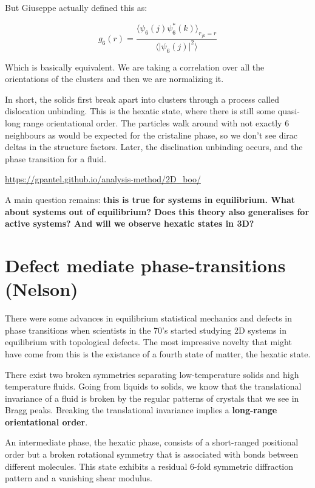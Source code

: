 \documentclass[a4paper]{article}
\begin{document}
But Giuseppe actually defined this as:

\begin{equation}
	g_6(r)=\frac{\langle\psi_6(j)\psi_6^*(k)\rangle_{r_{jk}=r}}{\langle\lvert\psi_6(j)\lvert^2\rangle}
\end{equation}

Which is basically equivalent. We are taking a correlation over all the orientations of the clusters and then we are normalizing it.

In short, the solids first break apart into clusters through a process called dislocation unbinding. This is the hexatic state, where there is still some quasi-long range orientational order. The particles walk around with not exactly 6 neighbours as would be expected for the cristaline phase, so we don't see dirac deltas in the structure factors. Later, the disclination unbinding occurs, and the phase transition for a fluid.

\url{https://gpantel.github.io/analysis-method/2D\_boo/}

A main question remains: \textbf{this is true for systems in equilibrium. What about systems out of equilibrium? Does this theory also generalises for active systems? And will we observe hexatic states in 3D?}

\section{Defect mediate phase-transitions (Nelson)}

There were some advances in equilibrium statistical mechanics and defects in phase transitions when scientists in the 70's started studying 2D systems in equilibrium with topological defects. The most impressive novelty that might have come from this is the existance of a fourth state of matter, the hexatic state.

There exist two broken symmetries separating low-temperature solids and high temperature fluids. Going from liquids to solids, we know that the translational invariance of a fluid is broken by the regular patterns of crystals that we see in Bragg peaks. Breaking the translational invariance implies a \textbf{long-range orientational order}. 

An intermediate phase, the hexatic phase, consists of a short-ranged positional order but a broken rotational symmetry that is associated with bonds between different molecules. This state exhibits a residual 6-fold symmetric diffraction pattern and a vanishing shear modulus.
\end{document}
